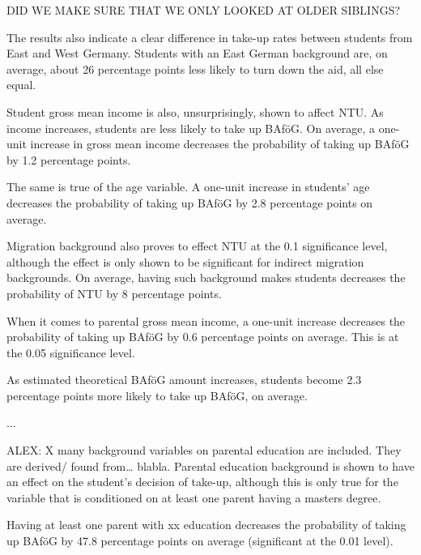 DID WE MAKE SURE THAT WE ONLY LOOKED AT OLDER SIBLINGS?

The results also indicate a clear difference in take-up rates between students from East and West Germany. Students with an East German background are, on average, about 26 percentage points less likely to turn down the aid, all else equal.

Student gross mean income is also, unsurprisingly, shown to affect NTU. As income increases, students are less likely to take up BAföG. On average, a one-unit increase in gross mean income decreases the probability of taking up BAföG by 1.2 percentage points.

The same is true of the age variable. A one-unit increase in students' age decreases the probability of taking up BAföG by 2.8 percentage points on average.

Migration background also proves to effect NTU at the 0.1 significance level, although the effect is only shown to be significant for indirect migration backgrounds. On average, having such background makes students decreases the probability of NTU by 8 percentage points.

When it comes to parental gross mean income, a one-unit increase decreases the probability of taking up BAföG by 0.6 percentage points on average. This is at the 0.05 significance level.

As estimated theoretical BAföG amount increases, students become 2.3 percentage points more likely to take up BAföG, on average.

...

ALEX: X many background variables on parental education are included. They are derived/ found from… blabla.
Parental education background is shown to have an effect on the student’s decision of take-up, although this is only true for the variable that is conditioned on at least one parent having a masters degree.

Having at least one parent with xx education decreases the probability of taking up BAföG by 47.8 percentage points on average (significant at the 0.01 level).




